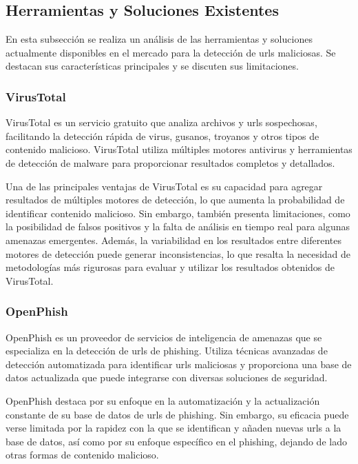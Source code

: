 \subsection{Herramientas y Soluciones Existentes}
En esta subsección se realiza un análisis de las herramientas y soluciones actualmente disponibles en el mercado para la detección de \glspl{url} maliciosas. Se destacan sus características principales y se discuten sus limitaciones.

\subsubsection*{VirusTotal}
VirusTotal es un servicio gratuito que analiza archivos y \glspl{url} sospechosas, facilitando la detección rápida de virus, gusanos, troyanos y otros tipos de contenido malicioso. VirusTotal utiliza múltiples motores antivirus y herramientas de detección de malware para proporcionar resultados completos y detallados\autocite{peng2019opening}.

Una de las principales ventajas de VirusTotal es su capacidad para agregar resultados de múltiples motores de detección, lo que aumenta la probabilidad de identificar contenido malicioso. Sin embargo, también presenta limitaciones, como la posibilidad de falsos positivos y la falta de análisis en tiempo real para algunas amenazas emergentes\autocite{ieee2017automated}. Además, la variabilidad en los resultados entre diferentes motores de detección puede generar inconsistencias, lo que resalta la necesidad de metodologías más rigurosas para evaluar y utilizar los resultados obtenidos de VirusTotal\autocite{misquitta2024comparative}.

\subsubsection*{OpenPhish}
OpenPhish es un proveedor de servicios de inteligencia de amenazas que se especializa en la detección de \glspl{url} de phishing. Utiliza técnicas avanzadas de detección automatizada para identificar \glspl{url} maliciosas y proporciona una base de datos actualizada que puede integrarse con diversas soluciones de seguridad\cite{ieee2021comparative}.

OpenPhish destaca por su enfoque en la automatización y la actualización constante de su base de datos de \glspl{url} de phishing. Sin embargo, su eficacia puede verse limitada por la rapidez con la que se identifican y añaden nuevas \glspl{url} a la base de datos, así como por su enfoque específico en el phishing, dejando de lado otras formas de contenido malicioso.

